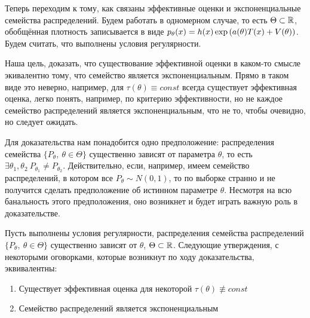 \begin{note}
    Теперь переходим к тому, как связаны эффективные оценки и экспоненциальные семейства распределений. Будем работать в одномерном случае, то есть $\Theta \subset \mathbb{R}$, обобщённая плотность записывается в виде $p_\theta(x) = h(x) \exp \left(a(\theta) T(x) + V(\theta)\right)$. Будем считать, что выполнены условия регулярности.
\end{note}

\begin{note}
    Наша цель, доказать, что существование эффективной оценки в каком-то смысле экивалентно тому, что семейство является экспоненциальным. Прямо в таком виде это неверно, например, для $\tau(\theta) \equiv const$ всегда существует эффективная оценка, легко понять, например, по критерию эффективности, но не каждое семейство распределений является экспоненциальным, что не то, чтобы очевидно, но следует ожидать.
\end{note}

\begin{note}
    Для доказательства нам понадобится одно предположение: распределения семейства $\{P_\theta,\ \theta \in \Theta\}$ существенно зависят от параметра $\theta$, то есть $\exists \theta_1, \theta_2 \ P_{\theta_1} \neq P_{\theta_2}$. Действительно, если, например, имеем семейство распределений, в котором все $P_\theta \sim N(0, 1)$, то по выборке странно и не получится сделать предположение об истинном параметре $\theta$. Несмотря на всю банальность этого предположения, оно возникнет и будет играть важную роль в доказательстве.
\end{note}

\begin{theorem}
    Пусть выполнены условия регулярности, распределения семейства распределений $\{P_\theta,\ \theta \in \Theta\}$ существенно зависят от $\theta$, $\Theta \subset \mathbb{R}$. Следующие утверждения, с некоторыми оговорками, которые возникнут по ходу доказательства, эквивалентны:
    \begin{enumerate}
        \item Существует эффективная оценка для некоторой $\tau(\theta) \not\equiv const$
        \item Семейство распределений является экспоненциальным
    \end{enumerate}
\end{theorem}

